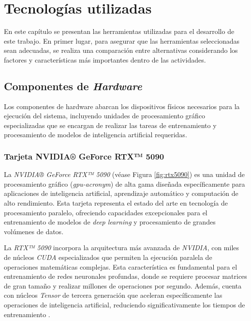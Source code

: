 \fancyhead{}
\fancyfoot{}
\pagestyle{plain}


\chapter{Tecnologías utilizadas}

En este capítulo se presentan las herramientas utilizadas para el desarrollo de este trabajo. En primer lugar, para asegurar que las herramientas seleccionadas sean adecuadas, se realiza una comparación entre alternativas considerando los factores y características más importantes dentro de las actividades.

\section{Componentes de \textit{Hardware}}

Los componentes de hardware abarcan los dispositivos físicos necesarios para la ejecución del sistema, incluyendo unidades de procesamiento gráfico especializadas que se encargan de realizar las tareas de entrenamiento y procesamiento de modelos de inteligencia artificial requeridas.

\subsection{Tarjeta NVIDIA® GeForce RTX™ 5090}

La \textit{NVIDIA® GeForce RTX™ 5090} (véase Figura \ref{fig:rtx5090}) es una unidad de procesamiento gráfico (\textit{\acrshort{gpu-acronym}}) de alta gama diseñada específicamente para aplicaciones de inteligencia artificial, aprendizaje automático y computación de alto rendimiento. Esta tarjeta representa el estado del arte en tecnología de procesamiento paralelo, ofreciendo capacidades excepcionales para el entrenamiento de modelos de \textit{deep learning} y procesamiento de grandes volúmenes de datos.

La \textit{RTX™ 5090} incorpora la arquitectura más avanzada de \textit{NVIDIA}, con miles de núcleos \textit{CUDA} especializados que permiten la ejecución paralela de operaciones matemáticas complejas. Esta característica es fundamental para el entrenamiento de redes neuronales profundas, donde se requiere procesar matrices de gran tamaño y realizar millones de operaciones por segundo. Además, cuenta con núcleos \textit{Tensor} de tercera generación que aceleran específicamente las operaciones de inteligencia artificial, reduciendo significativamente los tiempos de entrenamiento \cite{NVIDIA2024RTX5090}.

